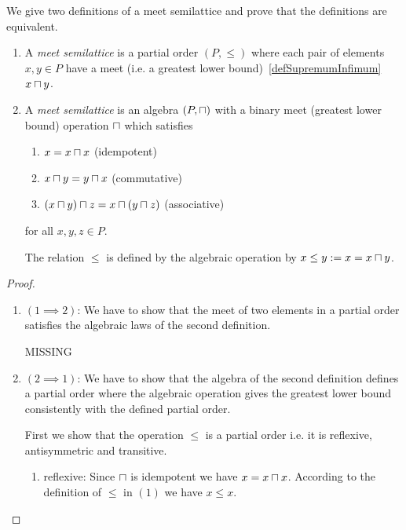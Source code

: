 \begin{definition}
    We give two definitions of a meet semilattice and prove that the definitions
    are equivalent.

    \begin{enumerate}
        \item A \emph{meet semilattice} is a partial order $(P, \le)$ where each
            pair of elements $x, y \in P$ have a meet (i.e. a greatest lower
            bound)~\ref{defSupremumInfimum} $x \sqcap y$.

        \item A \emph{meet semilattice} is an algebra $(P, \sqcap)$ with a binary
            meet (greatest lower bound) operation $\sqcap$ which satisfies
            \begin{enumerate}
                \item $x = x \sqcap x$ (idempotent)

                \item $x \sqcap y = y \sqcap x$ (commutative)

                \item $(x \sqcap y) \sqcap z = x \sqcap (y \sqcap z)$ (associative)
            \end{enumerate}
            for all $x, y, z \in P$.

            The relation $\le$ is defined by the algebraic operation by $x \le y
            := x = x \sqcap y$.
    \end{enumerate}

    \begin{proof}
        \begin{enumerate}
            \item $(1 \implies 2)$: We have to show that the meet of two
                elements in a partial order satisfies the algebraic laws of the
                second definition.

                MISSING

            \item $(2 \implies 1)$: We have to show that the algebra of the
                second definition defines a partial order where the algebraic
                operation gives the greatest lower bound consistently with the
                defined partial order.

                First we show that the operation $\le$ is a partial order i.e.
                it is reflexive, antisymmetric and transitive.

                \begin{enumerate}
                    \item reflexive: Since $\sqcap$ is idempotent we have $x = x
                        \sqcap x$. According to the definition of $\le$ in $(1)$
                        we have $x \le x$.


\end{enumerate}
\end{enumerate}
\end{proof}
\end{definition}
